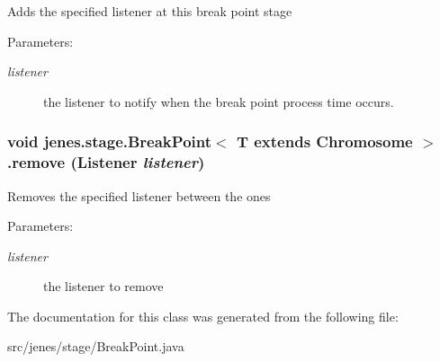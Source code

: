 Adds the specified listener at this break point stage

\begin{Desc}
\item[Parameters:]
\begin{description}
\item[{\em listener}]the listener to notify when the break point process time occurs. \end{description}
\end{Desc}
\hypertarget{classjenes_1_1stage_1_1_break_point_3_01_t_01extends_01_chromosome_01_4_367d07e34b42c06b692ec35d0a8f8a40}{
\subsubsection[remove]{\setlength{\rightskip}{0pt plus 5cm}void jenes.stage.BreakPoint$<$ T extends Chromosome $>$.remove (Listener {\em listener})}}
\label{classjenes_1_1stage_1_1_break_point_3_01_t_01extends_01_chromosome_01_4_367d07e34b42c06b692ec35d0a8f8a40}


Removes the specified listener between the ones

\begin{Desc}
\item[Parameters:]
\begin{description}
\item[{\em listener}]the listener to remove \end{description}
\end{Desc}


The documentation for this class was generated from the following file:\begin{CompactItemize}
\item 
src/jenes/stage/BreakPoint.java\end{CompactItemize}
